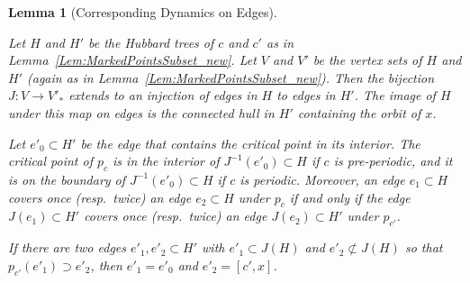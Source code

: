 \documentclass[12pt]{amsart}
\newcommand{\0}{\texttt{0}}
\newcommand{\1}{\texttt{1}}
\newtheorem{lemma}[theorem]{Lemma}
\theoremstyle{definition}
\numberwithin{equation}{section}
\newcommand{\lineclear}{\rule{0pt}{2pt}\newline}
\begin{document}
\begin{lemma}[Corresponding Dynamics on Edges]
\label{lem:HintoH'} \lineclear
{}
Let $H$ and $H'$ be the Hubbard trees of $c$ and $c'$ as in Lemma~\ref{Lem:MarkedPointsSubset_new}. Let $V$ and $V'$ be the vertex sets of $H$ and $H'$ (again as in Lemma~\ref{Lem:MarkedPointsSubset_new}). Then the bijection $J\colon V\to V'_*$ extends to an injection of edges in $H$ to edges in $H'$. The image of $H$ under this map on edges is the connected hull in $H'$ containing the orbit of $x$. 

Let $e'_0\subset H'$ be the edge that contains the critical point in its interior. 
The critical point of $p_c$ is in the interior of $J^{-1}(e'_0)\subset H$ if $c$ is pre-periodic, and it is on the boundary of $J^{-1}(e'_0)\subset H$ if $c$ is periodic.
Moreover, an edge $e_1\subset H$ covers once (resp.\ twice) an edge $e_2\subset H$ under $p_c$ if and only if the edge $J(e_1)\subset H'$ covers once (resp.\ twice) an edge $J(e_2)\subset H'$ under $p_{c'}$.

If there are two edges $e'_1,e'_2\subset H'$ with $e'_1\subset J(H)$ and $e'_2\not\subset J(H)$ so that $p_{c'}(e'_1)\supset e'_2$, then $e'_1=e'_0$ and $e'_2=[c',x]$.
\end{lemma}
\end{document}
